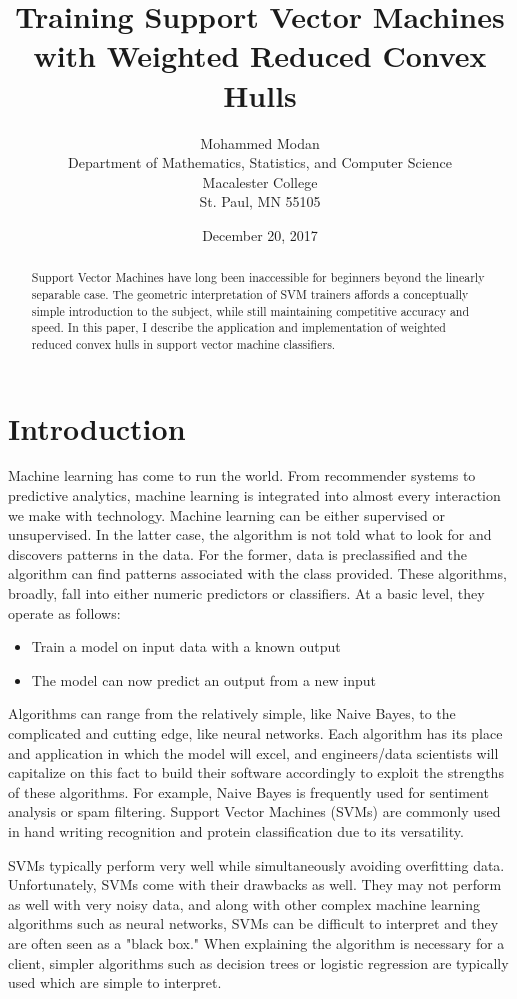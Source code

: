 \documentclass[11pt]{article}
\title{Training Support Vector Machines with Weighted Reduced Convex Hulls}
\author{Mohammed Modan \\  Department of Mathematics, Statistics, and Computer Science \\  Macalester College \\   St. Paul, MN 55105
}
\date{December 20, 2017}
\theoremstyle{remark}	  \newtheorem*{remark}{Remark}
\numberwithin{equation}{section}
\begin{document}
\maketitle

\begin{abstract}
\noindent
Support Vector Machines have long been inaccessible for beginners beyond the linearly separable case. The geometric interpretation of SVM trainers affords a conceptually simple introduction to the subject, while still maintaining competitive accuracy and speed. In this paper, I describe the application and implementation of weighted reduced convex hulls in support vector machine classifiers.

 \end{abstract}


\section{Introduction}

Machine learning has come to run the world. From recommender systems to predictive analytics, machine learning is integrated into almost every interaction we make with technology. Machine learning can be either supervised or unsupervised. In the latter case, the algorithm is not told what to look for and discovers patterns in the data. For the former, data is preclassified and the algorithm can find patterns associated with the class provided. These algorithms, broadly, fall into either numeric predictors or classifiers. At a basic level, they operate as follows:

\begin{itemize}
	\item Train a model on input data with a known output
	\item The model can now predict an output from a new input
\end{itemize}

Algorithms can range from the relatively simple, like Naive Bayes, to the complicated and cutting edge, like neural networks. Each algorithm has its place and application in which the model will excel, and engineers/data scientists will capitalize on this fact to build their software accordingly to exploit the strengths of these algorithms. For example, Naive Bayes is frequently used for sentiment analysis or spam filtering. Support Vector Machines (SVMs) are commonly used in hand writing recognition and protein classification due to its versatility.

SVMs typically perform very well while simultaneously avoiding overfitting data. Unfortunately, SVMs come with their drawbacks as well. They may not perform as well with very noisy data, and along with other complex machine learning algorithms such as neural networks, SVMs can be difficult to interpret and they are often seen as a "black box." When explaining the algorithm is necessary for a client, simpler algorithms such as decision trees or logistic regression are typically used which are simple to interpret.
\end{document}
